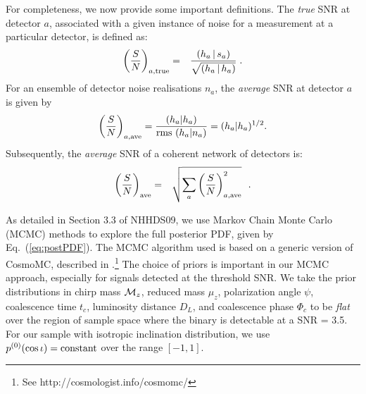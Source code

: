 \documentclass{emulateapj}
\begin{document}
For completeness, we now provide some important definitions. The {\it true}\/ SNR at detector $a$, associated with a given instance of
noise for a measurement at a particular detector, is defined as:
\begin{eqnarray}
\left({S\over N}\right)_{a, {\rm true}} & = & { \left( h_a \, |
\, s_a \right) \over \sqrt{ \left( h_a \, | \, h_a\right) } }\;.
\label{eq:snr_true}
\end{eqnarray}
For an ensemble of detector noise realisations $n_a$, the {\it
average} SNR at detector $a$ is given by
\begin{equation}
\label{eq:snr_ave}
\left({S\over N}\right)_{a, {\rm ave}} = {{(h_a | h_a)}\over
{ {\rm rms}\ (h_a|n_a)}} = (h_a|h_a)^{1/2}.
\end{equation}
Subsequently, the {\it average} SNR of a coherent network of detectors
is:
\begin{eqnarray}
\left({S\over N}\right)_{{\rm ave}} & = & \sqrt{\sum_a \left({S\over
N}\right)^2_{a, {\rm ave}}}\ \ .
\label{eq:snr_tot_ave}
\end{eqnarray}

As detailed in Section 3.3 of NHHDS09, we use Markov Chain Monte Carlo (MCMC) methods to explore
the full posterior PDF, given by Eq.\ (\ref{eq:postPDF}). The MCMC algorithm used is based on a generic version of
CosmoMC, described in \cite{lewis02}.\footnote{See http://cosmologist.info/cosmomc/}
The choice of priors is important in our MCMC approach, especially for
signals detected at the threshold SNR.  We take the prior
distributions in chirp mass ${\cal M}_z$, reduced mass $\mu_z$,
polarization angle $\psi$, coalescence time $t_c$, luminosity distance
$D_L$, and coalescence
phase $\Phi_c$ to be {\it flat} over the region of sample space where
the binary is detectable at a SNR = 3.5. For our sample with isotropic inclination
distribution, we use $p^{(0)}(\cos \iota) = {\rm constant}$ over the
range $[-1,1]$. 
\end{document}
